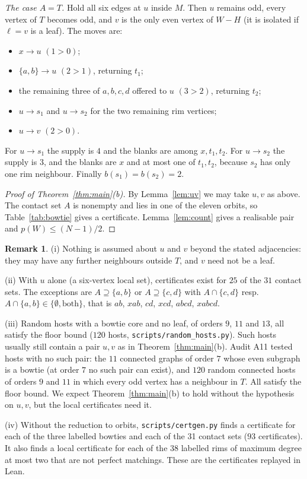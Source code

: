 \documentclass[11pt]{amsart}
\theoremstyle{definition}
\newtheorem{remark}[theorem]{Remark}
\newcommand{\tr}{\to}
\begin{document}
\emph{The case $A=T$.} Hold all six edges at $u$ inside $M$. Then $u$ remains odd, every vertex of
$T$ becomes odd, and $v$ is the only even vertex of $W-H$ (it is isolated if $\ell=v$ is a leaf). The
moves are:
\begin{itemize}
\item $x\tr u$ $(1{>}0)$;
\item $\{a,b\}\tr u$ $(2{>}1)$, returning $t_1$;
\item the remaining three of $a,b,c,d$ offered to $u$ $(3{>}2)$, returning $t_2$;
\item $u\tr s_1$ and $u\tr s_2$ for the two remaining rim vertices;
\item $u\tr v$ $(2{>}0)$.
\end{itemize}
For $u\tr s_1$ the supply is $4$ and the blanks are among $x,t_1,t_2$. For $u\tr s_2$ the supply is
$3$, and the blanks are $x$ and at most one of $t_1,t_2$, because $s_2$ has only one rim neighbour.
Finally $b(s_1)=b(s_2)=2$.

\begin{proof}[Proof of Theorem~\ref{thm:main}(b)]
By Lemma~\ref{lem:uv} we may take $u,v$ as above. The contact set $A$ is nonempty and lies in one
of the eleven orbits, so Table~\ref{tab:bowtie} gives a certificate. Lemma~\ref{lem:count} gives a
realisable pair and $p(W)\le(N-1)/2$.
\end{proof}

\begin{remark}\label{rem:bowtie}
(i) Nothing is assumed about $u$ and $v$ beyond the stated adjacencies: they may have any further
neighbours outside $T$, and $v$ need not be a leaf.

(ii) With $u$ alone (a six-vertex local set), certificates exist for $25$ of the $31$ contact sets.
The exceptions are $A\supseteq\{a,b\}$ or $A\supseteq\{c,d\}$ with $A\cap\{c,d\}$ resp.
$A\cap\{a,b\}\in\{\emptyset,\text{both}\}$, that is $ab$, $xab$, $cd$, $xcd$, $abcd$, $xabcd$.

(iii) Random hosts with a bowtie core and no leaf, of orders $9$, $11$ and $13$, all satisfy the
floor bound ($120$ hosts, \texttt{scripts/random\_hosts.py}). Such hosts usually still contain a
pair $u,v$ as in Theorem~\ref{thm:main}(b). Audit A11 tested hosts with no such pair: the $11$
connected graphs of order $7$ whose even subgraph is a bowtie (at order $7$ no such pair can exist),
and $120$ random connected hosts of orders $9$ and $11$ in which every odd vertex has a neighbour in
$T$. All satisfy the floor bound. We expect Theorem~\ref{thm:main}(b) to hold without the
hypothesis on $u,v$, but the local certificates need it.

(iv) Without the reduction to orbits, \texttt{scripts/certgen.py} finds a certificate for each of the
three labelled bowties and each of the 31 contact sets ($93$ certificates). It also finds a local
certificate for each of the $38$ labelled rims of maximum degree at most two that are not perfect
matchings. These are the certificates replayed in Lean.
\end{remark}
\end{document}
